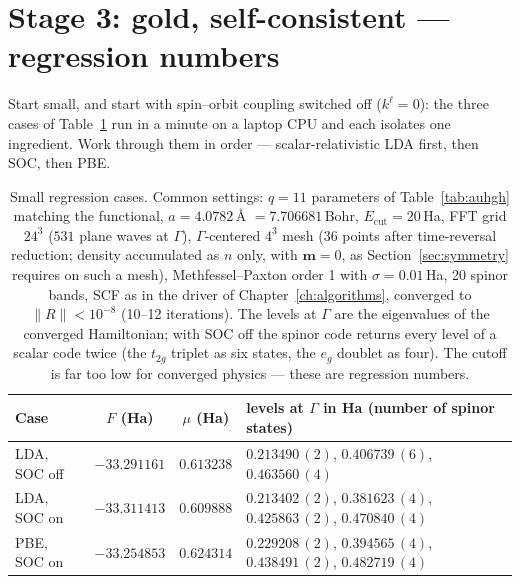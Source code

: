 \section{Stage 3: gold, self-consistent --- regression numbers}
\label{sec:stage3}

Start small, and start with spin--orbit coupling switched off
($k^\ell = 0$): the three cases of Table~\ref{tab:smallcases} run in a
minute on a laptop CPU and each isolates one ingredient. Work through them
in order --- scalar-relativistic LDA first, then SOC, then PBE.

\begin{table}[H]
\centering\small
\begin{tabular}{@{}lccl@{}}
\toprule
Case & $F$ (Ha) & $\mu$ (Ha) & levels at $\Gamma$ in Ha (number of spinor states)\\
\midrule
LDA, SOC off & $-33.291161$ & $0.613238$ & $0.213490\,(2)$, $0.406739\,(6)$, $0.463560\,(4)$\\
LDA, SOC on & $-33.311413$ & $0.609888$ & $0.213402\,(2)$, $0.381623\,(4)$, $0.425863\,(2)$, $0.470840\,(4)$\\
PBE, SOC on & $-33.254853$ & $0.624314$ & $0.229208\,(2)$, $0.394565\,(4)$, $0.438491\,(2)$, $0.482719\,(4)$\\
\bottomrule
\end{tabular}
\caption{Small regression cases. Common settings: $q = 11$ parameters of
Table~\ref{tab:auhgh} matching the functional, $a = 4.0782$\,\AA{}
$= 7.706681$\,Bohr, $E_{\mathrm{cut}} = 20$\,Ha, FFT grid $24^3$ ($531$
plane waves at $\Gamma$), $\Gamma$-centered $4^3$ mesh ($36$ points after
time-reversal reduction; density accumulated as $n$ only, with
$\mathbf m = 0$, as Section~\ref{sec:symmetry} requires on such a mesh), Methfessel--Paxton order 1 with
$\sigma = 0.01$\,Ha, 20 spinor bands, SCF as in the driver of
Chapter~\ref{ch:algorithms}, converged to $\|R\| < 10^{-8}$ (10--12
iterations). The levels at $\Gamma$ are the eigenvalues of the converged
Hamiltonian; with SOC off the spinor code returns every level of a scalar
code twice (the $t_{2g}$ triplet as six states, the $e_g$ doublet as
four). The cutoff is far too low for converged physics --- these are
regression numbers.}
\label{tab:smallcases}
\end{table}

